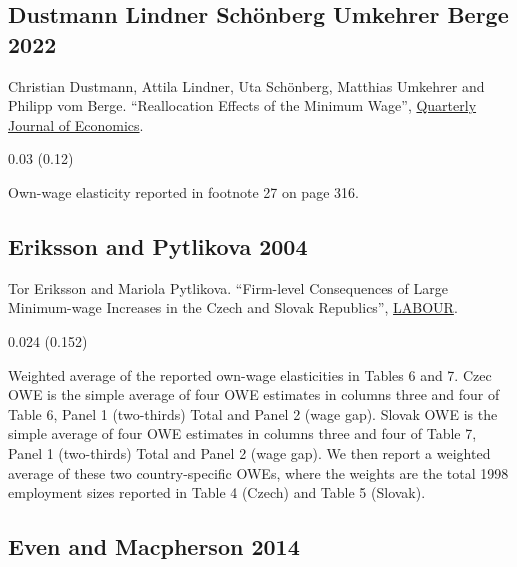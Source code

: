 \subsection*{Dustmann Lindner Schönberg Umkehrer Berge 2022}
\vspace{-0.7em}

\noindent Christian Dustmann, Attila Lindner, Uta Schönberg, Matthias Umkehrer and Philipp vom Berge. ``Reallocation Effects of the Minimum Wage'', \href{https://doi.org/10.1093/qje/qjab028}{Quarterly Journal of Economics}.

\vspace{0.7em}

 0.03 (0.12)

\vspace{0.7em}

 Own-wage elasticity reported in footnote 27 on page 316.

\subsection*{Eriksson and Pytlikova 2004}
\vspace{-0.7em}

\noindent Tor Eriksson and Mariola Pytlikova. ``Firm-level Consequences of Large Minimum-wage Increases in the Czech and Slovak Republics'', \href{https://doi.org/10.1111/j.1121-7081.2004.00259.x}{LABOUR}.

\vspace{0.7em}

 0.024 (0.152)

\vspace{0.7em}

 Weighted average of the reported own-wage elasticities in Tables 6 and 7. Czec OWE is the simple average of four OWE estimates in columns three and four of Table 6, Panel 1 (two-thirds) Total and Panel 2 (wage gap). Slovak OWE is the simple average of four OWE estimates in columns three and four of Table 7, Panel 1 (two-thirds) Total and Panel 2 (wage gap). We then report a weighted average of these two country-specific OWEs, where the weights are the total 1998 employment sizes reported in Table 4 (Czech) and Table 5 (Slovak).

\subsection*{Even and Macpherson 2014}
\vspace{-0.7em}

